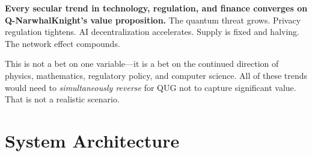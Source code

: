\documentclass[11pt,a4paper]{article}
\begin{document}
\begin{successbox}
\textbf{Every secular trend in technology, regulation, and finance converges on Q-NarwhalKnight's value proposition.} The quantum threat grows. Privacy regulation tightens. AI decentralization accelerates. Supply is fixed and halving. The network effect compounds.

This is not a bet on one variable---it is a bet on the continued direction of physics, mathematics, regulatory policy, and computer science. All of these trends would need to \textit{simultaneously reverse} for QUG not to capture significant value. That is not a realistic scenario.
\end{successbox}


\section{System Architecture}
\end{document}
